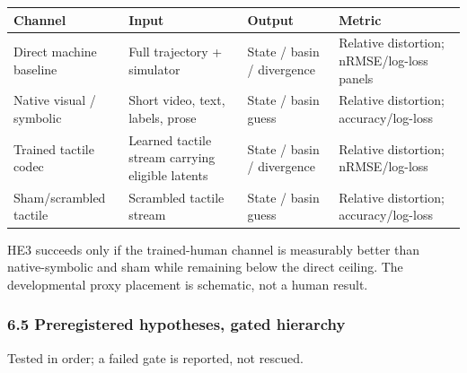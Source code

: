 \documentclass[
  11pt,
]{article}
\newcounter{none} %
\begin{document}
{\def\LTcaptype{none} %
\begin{longtable}[]{@{}
  >{\raggedright\arraybackslash}p{}
  >{\raggedright\arraybackslash}p{}
  >{\raggedright\arraybackslash}p{}
  >{\raggedright\arraybackslash}p{}@{}}
\toprule\noalign{}
\begin{minipage}[b]{\linewidth}\raggedright
Channel
\end{minipage} &
\begin{minipage}[b]{\linewidth}\raggedright
Input
\end{minipage} &
\begin{minipage}[b]{\linewidth}\raggedright
Output
\end{minipage} &
\begin{minipage}[b]{\linewidth}\raggedright
Metric
\end{minipage} \\
\midrule\noalign{}
\endhead
\bottomrule\noalign{}
\endlastfoot
Direct machine baseline & Full trajectory + simulator &
State / basin / divergence & Relative distortion;
nRMSE/log-loss panels \\
Native visual / symbolic & Short video, text, labels,
prose & State / basin guess & Relative distortion;
accuracy/log-loss \\
Trained tactile codec & Learned tactile stream carrying
eligible latents & State / basin / divergence &
Relative distortion; nRMSE/log-loss \\
Sham/scrambled tactile & Scrambled tactile stream &
State / basin guess & Relative distortion;
accuracy/log-loss \\
\end{longtable}
}

HE3 succeeds only if the trained-human channel is
measurably better than native-symbolic and sham while
remaining below the direct ceiling. The developmental
proxy placement is schematic, not a human result.

\subsubsection{6.5 Preregistered hypotheses, gated
hierarchy}\label{preregistered-hypotheses-gated-hierarchy}

Tested in order; a failed gate is reported, not
rescued.
\end{document}
